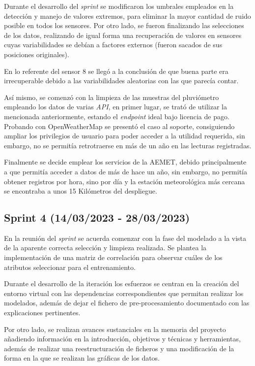 Durante el desarrollo del \textit{sprint} se modificaron los umbrales empleados en la detección y manejo de valores extremos, para eliminar la mayor
cantidad de ruido posible en todos los sensores.
Por otro lado, se fueron finalizando las selecciones de los datos, realizando de igual forma una recuperación de valores en sensores cuyas 
variabilidades se debían a factores externos (fueron sacados de sus posiciones originales).

En lo referente del sensor 8 se llegó a la conclusión de que buena parte era irrecuperable debido a las variabilidades aleatorias 
con las que parecía contar.

Así mismo, se comenzó con la limpieza de las muestras del pluviómetro empleando los datos de varias \textit{API}, en primer lugar, se trató de utilizar
la mencionada anteriormente, estando el \textit{endpoint} ideal bajo licencia de pago.
Probando con OpenWeatherMap se presentó el caso al soporte, consiguiendo ampliar los privilegios de usuario para poder acceder a la utilidad requerida, sin embargo, no
se permitía retrotraerse en más de un año en las lecturas registradas.

Finalmente se decide emplear los servicios de la AEMET, debido principalmente a que permitía acceder a datos de más de hace un año, sin embargo, no permitía obtener 
registros por hora, sino por día y la estación meteorológica más cercana se encontraba a unos 15 Kilómetros
del despliegue.

\subsection{Sprint 4 (14/03/2023 - 28/03/2023)}
En la reunión del \textit{sprint} se acuerda comenzar con la fase del modelado a la vista de la aparente correcta selección y limpieza realizada.
Se plantea la implementación de una matriz de correlación para observar cuáles de los atributos seleccionar para el entrenamiento.

Durante el desarrollo de la iteración los esfuerzos se centran en la creación del entorno virtual con las dependencias correspondientes que permitan 
realizar los modelados, además de dejar el fichero de pre-procesamiento documentado con las explicaciones pertinentes.

Por otro lado, se realizan avances sustanciales en la memoria del proyecto añadiendo información en la introducción, objetivos y técnicas y herramientas,
además de realizar una reestructuración de ficheros y una modificación de la forma en la que se realizan las gráficas de los datos.

